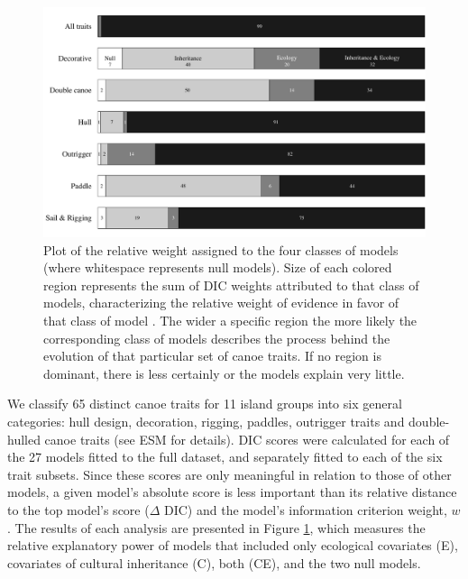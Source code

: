 \documentclass[11pt]{article}
\begin{document}
\begin{figure}[t]
  \begin{center}
    \includegraphics[scale=0.5]{figures/barplot.pdf}
  \end{center}
  \caption{Plot of the relative weight assigned to the four classes of models (where whitespace represents null models). Size of each colored region represents the sum of DIC weights attributed to that class of models, characterizing the relative weight of evidence in favor of that class of model \citep{Burnham&Anderson:2002}. The wider a specific region the more likely the corresponding class of models describes the process behind the evolution of that particular set of canoe traits. If no region is dominant, there is less certainly or the models explain very little.}
  \label{fig:barplot}
\end{figure}

We classify 65 distinct canoe traits for 11 island groups into six general categories: hull design, decoration, rigging, paddles, outrigger traits and double-hulled canoe traits (see ESM for details). DIC scores were calculated for each of the 27 models fitted to the full dataset, and separately fitted to each of the six trait subsets. Since these scores are only meaningful in relation to those of other models, a given model's absolute score is less important than its relative distance to the top model's score ($\Delta$ DIC) and the model's information criterion weight, $w$. The results of each analysis are presented in Figure \ref{fig:barplot}, which measures the relative explanatory power of models that included only ecological covariates (E), covariates of cultural inheritance (C), both (CE), and the two null models.
\end{document}
